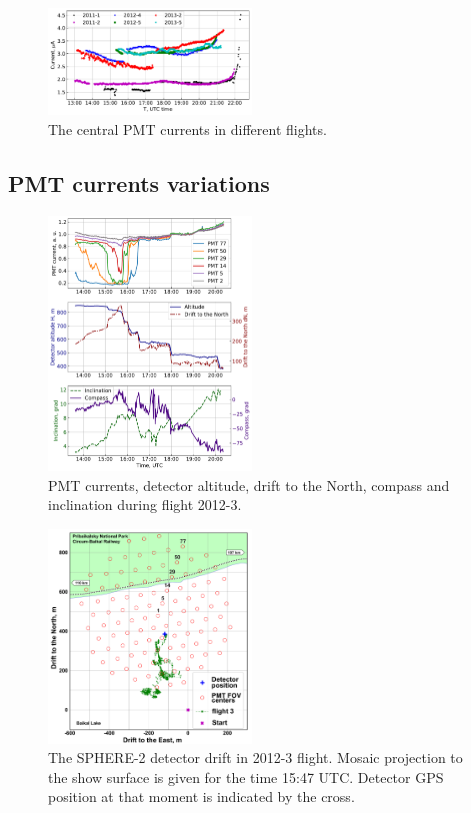 \documentclass[final,5p,times,twocolumn]{elsarticle}
\begin{document}
\begin{figure}[tb]
    \includegraphics[width=0.48\textwidth]{hv-53.pdf}
    \caption{The central PMT currents in different flights.}
\label{fig:current}
\end{figure}


\subsection{PMT currents variations}

\begin{figure}[tb]
    \includegraphics[width=0.48\textwidth]{2012-3_currents_H_dN.pdf}
    \caption{PMT currents, detector altitude, drift to the North, compass and inclination during flight 2012-3.}
    \label{fig:2012-3_currents}
\end{figure}

\begin{figure}[tb]
    \includegraphics[width=0.48\textwidth]{2012_drift-mod.pdf}
    \caption{The SPHERE-2 detector drift in 2012-3 flight. Mosaic projection to the show surface is given for the time 15:47 UTC. Detector GPS position at that moment is indicated by the cross.}
    \label{fig:2012-drift}
\end{figure}
\end{document}
